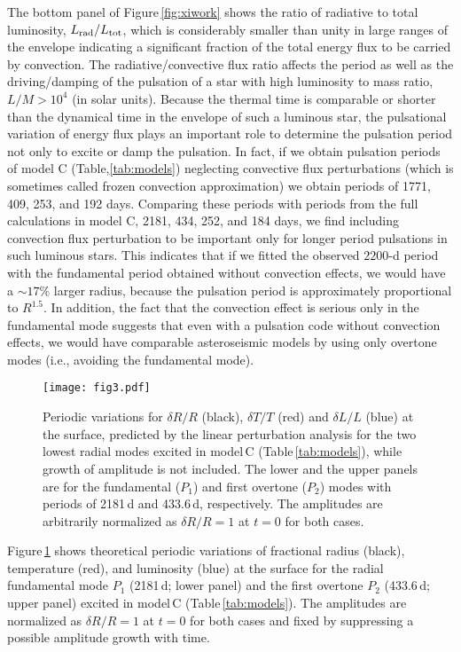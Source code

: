 \documentclass[fleqn,usenatbib]{mnras}
\begin{document}
The bottom panel of Figure\,\ref{fig:xiwork} shows the ratio of radiative to 
total luminosity, $L_{\rm rad}/L_{\rm tot}$, which is considerably smaller 
than unity in large ranges of the envelope indicating a significant fraction of
the total energy flux to be carried by convection.
The radiative/convective flux ratio affects the
period as well as the driving/damping of the pulsation of a star
with high luminosity to mass ratio, $L/M > 10^4$ (in solar units). 
Because the thermal time is comparable or shorter than
the dynamical time in the envelope of such a luminous star,
the pulsational variation of energy flux plays an important role to
determine the pulsation period not only to excite or damp the pulsation. 
In fact, if we obtain pulsation periods of model C (Table,\ref{tab:models}) 
neglecting convective flux perturbations (which is sometimes called
frozen convection approximation) we obtain periods of 1771, 409, 253, and 192 days.
Comparing these periods with periods from the full calculations in model C,
2181, 434, 252, and 184 days, we find including convection flux perturbation to be 
important only for longer period pulsations in such luminous stars.
This indicates that if we fitted the observed $2200$-d period with the fundamental period obtained without convection effects, we would have a $\sim17\%$ larger radius, because the pulsation period is approximately proportional to $R^{1.5}$.
In addition, the fact that the convection effect is serious only in the fundamental mode suggests that even with a pulsation code without convection effects, we would have comparable asteroseismic models by using only overtone modes (i.e., avoiding the fundamental mode). 

\begin{figure}
\texttt{[image: fig3.pdf]}  %
\caption{Periodic variations for $\delta R/R$ (black), $\delta T/T$ (red) and
$\delta L/L$ (blue) at the surface, predicted by the linear perturbation analysis 
for the two lowest radial modes excited in model\,C (Table\,\ref{tab:models}),
while growth of amplitude is not included.
The lower and the upper panels are for the fundamental ($P_1$) and 
first overtone ($P_2$) modes
 with periods of 2181\,d and 433.6\,d, respectively. 
The amplitudes are arbitrarily normalized as $\delta R/R=1$ at $t=0$ for both
cases.}
\label{fig:LCmodel}
\end{figure}
Figure\,\ref{fig:LCmodel} shows theoretical periodic variations of fractional
radius (black), temperature (red), and luminosity (blue) at the surface 
for the radial fundamental mode $P_1$ (2181\,d; lower panel) and the first overtone 
$P_2$ (433.6\,d; upper panel) excited in model\,C (Table\,\ref{tab:models}).
The amplitudes are normalized as $\delta R/R=1$ at $t=0$ for both cases and 
fixed by suppressing a possible amplitude growth with time.
\end{document}
